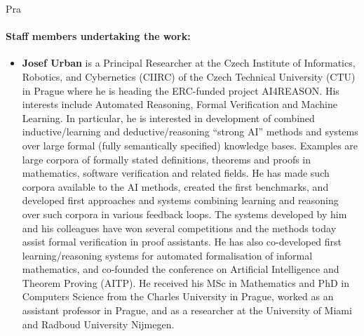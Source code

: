 \begin{sitedescription}{Pra}
\paragraph{Staff members undertaking the work:}



\begin{itemize}
\item
\textbf{Josef Urban} is a Principal Researcher at the Czech Institute of Informatics, Robotics, and Cybernetics (CIIRC) of the Czech Technical University (CTU) in Prague where he is heading the ERC-funded project
AI4REASON. His interests include Automated Reasoning, Formal Verification and Machine Learning. In particular, he is interested in development of combined inductive/learning and deductive/reasoning
``strong AI'' methods and systems over large formal (fully semantically specified) knowledge bases. Examples are large corpora of formally stated definitions, theorems and proofs in mathematics, software
verification and related fields.  He has made such corpora available to the AI methods, created the first benchmarks, and developed first approaches and systems combining learning and reasoning over such
corpora in various feedback loops.  The systems developed by him and his colleagues have won several competitions and the methods today assist formal verification in proof assistants. He has also
co-developed first learning/reasoning systems for automated formalisation of informal mathematics, and co-founded the conference on Artificial Intelligence and Theorem Proving (AITP).
He received his MSc in Mathematics and PhD in Computers Science from
the Charles University in Prague, worked as an assistant professor in
Prague, and as a researcher at the University of Miami and Radboud
University Nijmegen.




\end{itemize}
\end{sitedescription}
